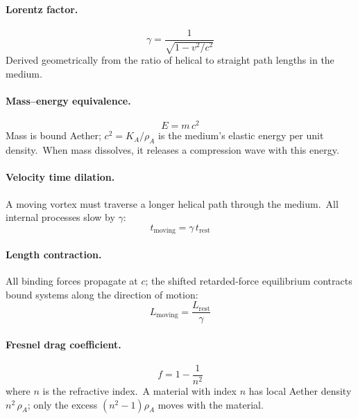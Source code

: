 ﻿\documentclass[12pt,letterpaper]{article}
\newcommand{\rhoa}{\rho_{\!A}}
\newcommand{\Ka}{K_{\!A}}
\begin{document}
\paragraph{Lorentz factor.}
%
\begin{equation}
  \gamma = \frac{1}{\sqrt{1 - v^2/c^2}}
  \label{eq:sum-lorentz}
\end{equation}
%
Derived geometrically from the ratio of helical to straight path lengths
in the medium.

\paragraph{Mass--energy equivalence.}
%
\begin{equation}
  E = m\,c^2
  \label{eq:sum-emc2}
\end{equation}
%
Mass is bound Aether; $c^2 = \Ka/\rhoa$ is the medium's elastic energy per
unit density.\ When mass dissolves, it releases a compression wave with this
energy.

\paragraph{Velocity time dilation.}
A moving vortex must traverse a longer helical path through the medium.\ All
internal processes slow by $\gamma$:
%
\begin{equation}
  t_{\mathrm{moving}} = \gamma\,t_{\mathrm{rest}}
  \label{eq:sum-vel-time-dilation}
\end{equation}

\paragraph{Length contraction.}
All binding forces propagate at $c$; the shifted retarded-force equilibrium
contracts bound systems along the direction of motion:
%
\begin{equation}
  L_{\mathrm{moving}} = \frac{L_{\mathrm{rest}}}{\gamma}
  \label{eq:sum-length-contraction}
\end{equation}

\paragraph{Fresnel drag coefficient.}
%
\begin{equation}
  f = 1 - \frac{1}{n^2}
  \label{eq:sum-fresnel}
\end{equation}
%
where $n$ is the refractive index.\ A material with index $n$ has local Aether
density $n^2\,\rhoa$; only the excess $(n^2 - 1)\rhoa$ moves with the material.
\end{document}
